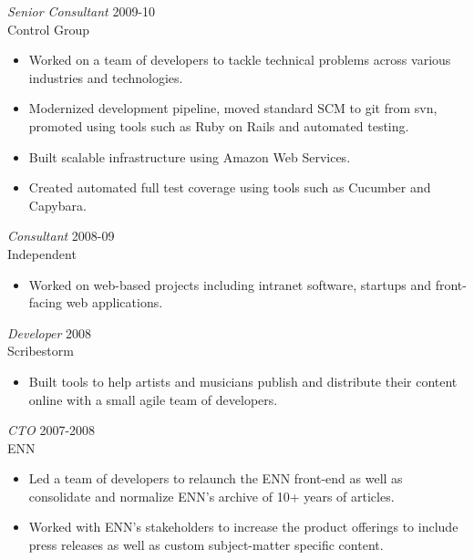 \documentclass[line,margin]{res}
\begin{document}
\begin{resume}
    {\sl Senior Consultant}
    \hfill 2009-10 \\
    Control Group
    \begin{itemize} \itemsep -2pt
        \item
            Worked on a team of developers to tackle technical problems across
            various industries and technologies.
        \item
            Modernized development pipeline, moved standard SCM to git from svn,
            promoted using tools such as Ruby on Rails and automated testing.
        \item
            Built scalable infrastructure using Amazon Web Services.
        \item
            Created automated full test coverage using tools such as Cucumber and
            Capybara.
    \end{itemize}

    {\sl Consultant}
    \hfill 2008-09 \\
    Independent
    \begin{itemize} \itemsep -2pt
        \item
            Worked on web-based projects including intranet software, startups and
            front-facing web applications.
    \end{itemize}

    \begin{samepage}
    {\sl Developer}
    \hfill 2008 \\
    Scribestorm
    \begin{itemize} \itemsep -2pt
        \item
            Built tools to help artists and musicians publish and distribute their
            content online with a small agile team of developers.
    \end{itemize}
    \end{samepage}

    {\sl CTO}
    \hfill 2007-2008 \\
    ENN
    \begin{itemize} \itemsep -2pt
        \item
            Led a team of developers to relaunch the ENN front-end as well as
            consolidate and normalize ENN's archive of 10+ years of articles.
        \item
            Worked with ENN's stakeholders to increase the product offerings to include
            press releases as well as custom subject-matter specific content.
    \end{itemize}


\end{resume}
\end{document}

